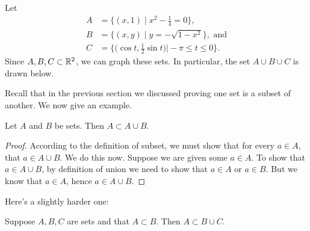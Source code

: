 \documentclass{tufte-book}
\begin{document}
\begin{example}
  Let 
\begin{align*}
A &= \bigg\{(x, 1) \mid x^2 - \frac14 = 0\bigg\},\\
B &= \{(x, y) \mid y = -\sqrt{1-x^2}\}, \text{ and}\\
C &= \bigg\{\bigg(\cos t, \frac12 \sin t\bigg) \bigg| -\pi \leq t \leq 0\bigg\}.
\end{align*}
Since $A, B, C \subset \mathbb{R}^2$, we can graph these sets. In particular, the set $A \cup B \cup C$ is drawn below.
    \begin{center}
  \end{center}

\end{example}

Recall that in the previous section we discussed proving one set is a subset of another. We now give an example.
\begin{proposition}
  Let $A$ and $B$ be sets. Then $A \subset A \cup B$.
\end{proposition}

\begin{proof}
  According to the definition of subset, we must show that for every $a \in A$, that $a \in A \cup B$. We do this now. Suppose we are given some $a \in A$. To show that $a \in A \cup B$, by definition of union we need to show that $a \in A$ or $a \in B$. But we know that $a \in A$, hence $a \in A \cup B$.
\end{proof}

Here's a slightly harder one:
\begin{proposition}
  Suppose $A, B, C$ are sets and that $A \subset B$. Then $A \subset B \cup C$.
\end{proposition}
\end{document}
